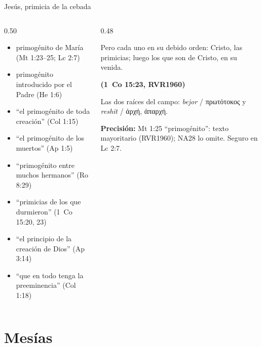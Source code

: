 \documentclass[hyperref={bookmarks=false},aspectratio=169]{beamer}
\newcommand{\grc}[1]{\foreignlanguage{ancientgreek}{#1}}
\newcommand{\fuente}[1]{\par\hfill{\upshape\bfseries\footnotesize\textcolor{tierraroja}{#1}}}
\newcommand{\precision}[1]{{\footnotesize\color{sepia}\textbf{Precisión:} #1}}
\begin{document}
\begin{frame}{Jesús, primicia de la cebada}
\begin{columns}[c,onlytextwidth]
\begin{column}{0.50\textwidth}\scriptsize\RaggedRight
\begin{itemize}
\item primogénito de María (Mt 1:23--25; Lc 2:7)
\item primogénito introducido por el Padre (He 1:6)
\item ``el primogénito de toda creación'' (Col 1:15)
\item ``el primogénito de los muertos'' (Ap 1:5)
\item ``primogénito entre muchos hermanos'' (Ro 8:29)
\item ``primicias de los que durmieron'' (1~Co 15:20, 23)
\item ``el principio de la creación de Dios'' (Ap 3:14)
\item ``que en todo tenga la preeminencia'' (Col 1:18)
\end{itemize}
\end{column}
\begin{column}{0.48\textwidth}
\begin{cita}Pero cada uno en su debido orden: Cristo, las primicias; luego los que son de Cristo, en su venida.\fuente{(1~Co 15:23, RVR1960)}\end{cita}
\scriptsize\RaggedRight Las dos raíces del campo: \emph{bejor} / \grc{πρωτότοκος} y \emph{reshit} / \grc{ἀρχή}, \grc{ἀπαρχή}.\par\smallskip
\precision{Mt 1:25 ``primogénito'': texto mayoritario (RVR1960); NA28 lo omite. Seguro en Lc 2:7.}
\end{column}
\end{columns}
\end{frame}

\section{Mesías}
\end{document}
